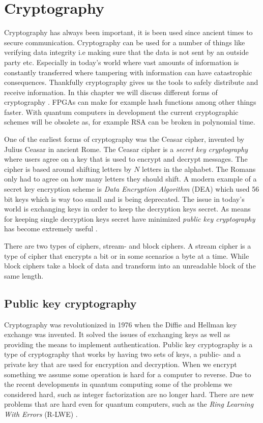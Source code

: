 \chapter{Cryptography\label{crypto}}
Cryptography has always been important, it is been used since ancient times to
secure communication. Cryptography can be used for a number of things like
verifying data integrity i.e making sure that the data is not sent by an outside
party etc. Especially in today's world where vast amounts of information is
constantly transferred where tampering with information can have catastrophic
consequences. Thankfully cryptography gives us the tools to safely distribute
and receive information. In this chapter we will discuss different forms of
cryptography . FPGAs can make for example hash functions among other things
faster. With quantum computers in development the current cryptographic schemes
will be obsolete as, for example RSA can be broken in polynomial time.

One of the earliest forms of cryptography was the Ceasar cipher, invented by
Julius Ceasar in ancient Rome. The Ceasar cipher is a \textit{secret key
cryptography} where users agree on a key that is used to encrypt and decrypt
messages. The cipher is based around shifting letters by $N$ letters in the
alphabet. The Romans only had to agree on how many letters they should shift. A
modern example of a secret key encryption scheme is \textit{Data Encryption
Algorithm} (DEA) which used 56 bit keys which is way too small and is being
deprecated. The issue in today's world is exchanging keys in order to keep the
decryption keys secret. As means for keeping single decryption keys secret have
minimized \textit{public key cryptography} has become extremely useful
\citep{FranciscoRodriguez-Henriquez10}.

There are two types of ciphers, stream- and block ciphers. A stream cipher is
a type of cipher that encrypts a bit or in some scenarios a byte at a time.
While block ciphers take a block of data and transform into an unreadable block
of the same length.

\section{Public key cryptography}
Cryptography was revolutionized in 1976 when the Diffie and Hellman key
exchange was invented. It solved the issues of exchanging keys as well as
providing the means to implement authentication. Public key cryptography is a
type of cryptography that works by having two sets of keys, a public- and a
private key that are used for encryption and decryption. When we encrypt
something we assume some operation is hard for a computer to reverse. Due to
the recent developments in quantum computing some of the problems we considered
hard, such as integer factorization are no longer hard. There are new problems
that are hard even for quantum computers, such as the \textit{Ring Learning
With Errors} (R-LWE) \citep{FPGA_Post_Quantum_Primitives}.

